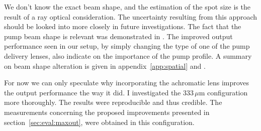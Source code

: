 We don't know the exact beam shape,
and the estimation
of the spot size
is the result
of a ray optical consideration.
The uncertainty
resulting from this approach
should be looked into more closely
in future investigations.
The fact that the pump beam shape
is relevant
was demonstrated
in \cite{Chernikov2010}.
The improved output performance
seen in our setup,
by simply changing
the type of
one of the pump delivery lenses,
also indicate
on the importance
of the pump profile.
A summary on beam shape alteration
is given
in appendix~\ref{app:spatial}
and \cite{Mansell2000}. 

For now we can only speculate
why incorporating
the achromatic lens
improves the output performance
the way it did.
I investigated
the $333\,\mu\mathrm{m}$ configuration
more thoroughly.
The results were
reproducible and thus credible.
The measurements
concerning the proposed improvements
\cite{Hader2011}
presented in section~\ref{sec:eval:maxout},
were obtained in this configuration.